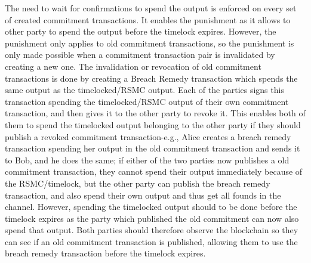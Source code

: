 The need to wait for confirmations to spend the output is enforced on every set of created commitment transactions. It enables the punishment as it allows to other party to spend the output before the timelock expires. However, the punishment only applies to old commitment transactions, so the punishment is only made possible when a commitment transaction pair is invalidated by creating a new one. The invalidation or revocation of old commitment transactions is done by creating a Breach Remedy transaction which spends the same output as the timelocked/RSMC output. Each of the parties signs this transaction spending the timelocked/RSMC output of their own commitment transaction, and then gives it to the other party to revoke it. This enables both of them to spend the timelocked output belonging to the other party if they should publish a revoked commitment transaction-e.g., Alice creates a breach remedy transaction spending her output in the old commitment transaction and sends it to Bob, and he does the same; if either of the two parties now publishes a old commitment transaction, they cannot spend their output immediately because of the RSMC/timelock, but the other party can publish the breach remedy transaction, and also spend their own output and thus get all founds in the channel. However, spending the timelocked output should to be done before the timelock expires as the party which published the old commitment can now also spend that output. Both parties should therefore observe the blockchain so they can see if an old commitment transaction is published, allowing them to use the breach remedy transaction before the timelock expires.
\\

